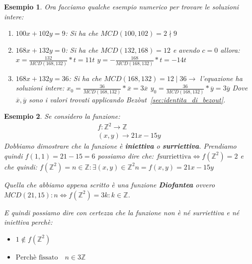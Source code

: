 \documentclass{article}
\newtheorem{exmp}{Esempio}[section]
\theoremstyle{definition}
\begin{document}
\begin{exmp}
        Ora facciamo qualche esempio numerico per trovare le soluzioni intere:
        \begin{enumerate}
                \item $ 100x + 102y = 9 $: \newline
                        Si ha che $ MCD(100,102) = 2 \nmid 9 $
                \item $ 168x + 132y = 0 $: \newline
                        Si ha che $ MCD(132,168) = 12$ e avendo $ c = 0 $ allora: \newline
                        $ x = \frac{132}{MCD(168,132)} * t = 11t $ \newline 
                        $ y = -\frac{168}{MCD(168,132)} * t = -14t $
                \item  $ 168x + 132y = 36 $: \newline
                        Si ha che $ MCD(168, 132) = 12 \mid 36 \rightarrow $ l'equazione ha soluzioni intere: \newline
                        $ x_0 = \frac{36}{MCD(168, 132)}*\overline{x} = 3\overline{x}$ \newline
                        $ y_0 = \frac{36}{MCD(168, 132)}*\overline{y} = 3\overline{y}$ \newline
                        Dove $ \overline{x},\overline{y}$ sono i valori trovati applicando Bezòut~\ref{sec:identita_di_bezout}.  
        \end{enumerate}
\end{exmp}

\begin{exmp}
Se considero la funzione:
\begin{align}
        f :  \mathbb{Z}^{2} \rightarrow \mathbb{Z} \\
        (x,y) \rightarrow 21x - 15y
\end{align}
Dobbiamo dimostrare che la funzione è \textbf{iniettiva} o \textbf{surriettiva}.
Prendiamo quindi $f(1,1) = 21 - 15 = 6$ possiamo dire che:
$f \textrm{surriettiva} \Leftrightarrow f(\mathbb{Z}^{2}) = 2$
e che quindi:
$f(\mathbb{Z}^{2}) = {n \in \mathbb{Z} : \exists(x,y) \in \mathbb{Z}^{2} n=f(x,y)=21x - 15y} $
     
Quella che abbiamo appena scritto è una funzione \textbf{Diofantea} ovvero $MCD(21,15) : n \Leftrightarrow f(\mathbb{Z}^{2})={3k : k \in \mathbb{Z}}$. \par

E quindi possiamo dire con certezza che la funzione non è né surriettiva e né iniettiva perchè:
\begin{itemize}
        \item $  1 \notin f(\mathbb{Z}^{2}) $  
        \item $  \textrm{Perchè fissato} \quad n \in 3\mathbb{Z}$   
\end{itemize}
\end{exmp}
\end{document}
